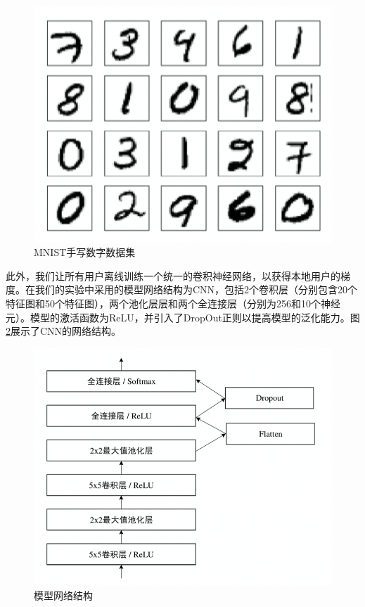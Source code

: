 \begin{figure}[!hbt]
\centering
	\includegraphics[scale=0.6]{fig2/C3/MNIST}%
	\caption{MNIST手写数字数据集}
	\label{fig:MNIST手写数字数据集}	
\end{figure}

此外，我们让所有用户离线训练一个统一的卷积神经网络，以获得本地用户的梯度。在我们的实验中采用的模型网络结构为CNN，包括2个卷积层（分别包含20个特征图和50个特征图），两个池化层层和两个全连接层（分别为256和10个神经元）。模型的激活函数为ReLU，并引入了DropOut正则以提高模型的泛化能力。图\ref{fig:CNN模型网络结构}展示了CNN的网络结构。

\begin{figure}[!hbt]
\centering
	\includegraphics[scale=0.6]{fig2/C3/CNN网络结构}%
	\caption{模型网络结构}
	\label{fig:CNN模型网络结构}	
\end{figure}

